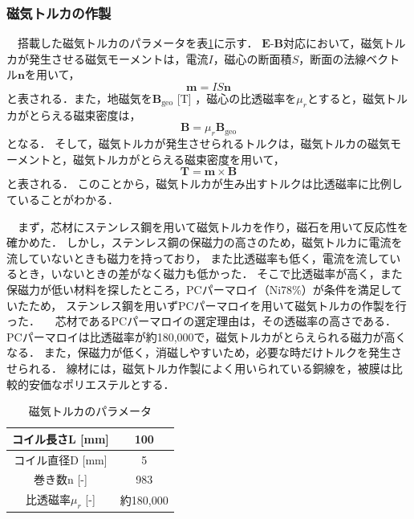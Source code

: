 \subsubsection{磁気トルカの作製}

　搭載した磁気トルカのパラメータを表\ref{table:torquer}に示す．
$\boldsymbol{E\text{-}B}$対応において，磁気トルカが発生させる磁気モーメントは，電流$I$，磁心の断面積$S$，断面の法線ベクトル$\boldsymbol{n}$を用いて，
\begin{equation}
	\boldsymbol{m}=IS\boldsymbol{n}
\end{equation}
と表される．また，地磁気を$\boldsymbol{B}_\mathrm{geo}$ [T] ，磁心の比透磁率を$\mu_r$とすると，磁気トルカがとらえる磁束密度は，
\begin{equation}
	\boldsymbol{B} = \mu_r\boldsymbol{B}_\mathrm{geo}
\end{equation}
となる．
そして，磁気トルカが発生させられるトルクは，磁気トルカの磁気モーメントと，磁気トルカがとらえる磁束密度を用いて，
\begin{equation}
	\boldsymbol{T = m \times B}
\end{equation}
と表される．
このことから，磁気トルカが生み出すトルクは比透磁率に比例していることがわかる．

　まず，芯材にステンレス鋼を用いて磁気トルカを作り，磁石を用いて反応性を確かめた．
しかし，ステンレス鋼の保磁力の高さのため，磁気トルカに電流を流していないときも磁力を持っており，
また比透磁率も低く，電流を流しているとき，いないときの差がなく磁力も低かった．
そこで比透磁率が高く，また保磁力が低い材料を探したところ，PCパーマロイ（Ni78\%）が条件を満足していたため，
ステンレス鋼を用いずPCパーマロイを用いて磁気トルカの作製を行った．
　芯材であるPCパーマロイの選定理由は，その透磁率の高さである．PCパーマロイは比透磁率が約180,000で，磁気トルカがとらえられる磁力が高くなる．
また，保磁力が低く，消磁しやすいため，必要な時だけトルクを発生させられる．
線材には，磁気トルカ作製によく用いられている銅線を，被膜は比較的安価なポリエステルとする．

\begin{table}[H]
	\centering
	\caption{磁気トルカのパラメータ}
	\label{table:torquer}
	\begin{tabular}{|c||c|}
		\hline
		コイル長さL [mm] & 100\\ \hline
		コイル直径D [mm] & 5\\ \hline
		巻き数n [-] & 983 \\ \hline
		比透磁率$\mu_r$ [-] & 約180,000 \\ \hline  
	\end{tabular}
\end{table}


